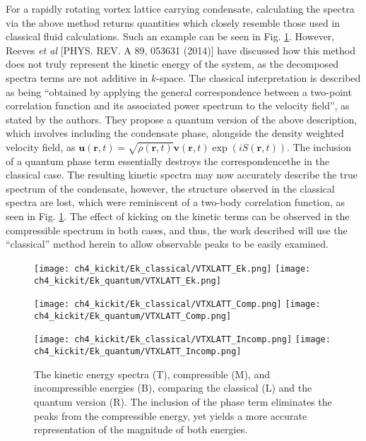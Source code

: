 For a rapidly rotating vortex lattice carrying condensate, calculating the spectra via the above method returns quantities which closely resemble those used in classical fluid calculations. Such an example can be seen in Fig. \ref{fig:ek_clvqu}. However, Reeves {\it et al} [PHYS. REV. A 89, 053631 (2014)] have discussed how this method does not truly represent the kinetic energy of the system, as the decomposed spectra terms are not additive in $k$-space. The classical interpretation is described as being ``obtained by applying the general correspondence between a two-point correlation function and its associated
power spectrum to the velocity field'', as stated by the authors. They propose a quantum version of the above description, which involves including the condensate phase, alongside the density weighted velocity field, as $\mathbf{u}(\mathbf{r},t) = \sqrt{\rho(\mathbf{r},t)}\mathbf{v}(\mathbf{r},t)\exp\left(iS(\mathbf{r},t)\right)$. The inclusion of a quantum phase term essentially destroys the correspondencethe in the classical case. The resulting kinetic spectra may now accurately describe the true spectrum of the condensate, however, the structure observed in the classical spectra are lost, which were reminiscent of a two-body correlation function, as seen in Fig. \ref{fig:ek_clvqu}. The effect of kicking on the kinetic terms can be observed in the compressible spectrum in both cases, and thus, the work described will use the ``classical'' method herein to allow observable peaks to be easily examined.

\begin{figure}[tb]
    \centering
    \texttt{[image: ch4\_kickit/Ek\_classical/VTXLATT\_Ek.png]}
    \texttt{[image: ch4\_kickit/Ek\_quantum/VTXLATT\_Ek.png]}

    \texttt{[image: ch4\_kickit/Ek\_classical/VTXLATT\_Comp.png]}
    \texttt{[image: ch4\_kickit/Ek\_quantum/VTXLATT\_Comp.png]}

    \texttt{[image: ch4\_kickit/Ek\_classical/VTXLATT\_Incomp.png]}
    \texttt{[image: ch4\_kickit/Ek\_quantum/VTXLATT\_Incomp.png]}

\caption[Kinetic energy spectra with and without quantum phase.]{The kinetic energy spectra (T), compressible (M), and incompressible energies (B), comparing the classical (L) and the quantum version (R). The inclusion of the phase term eliminates the peaks from the compressible energy, yet yields a more accurate representation of the magnitude of both energies.}
\label{fig:ek_clvqu}
\end{figure}


